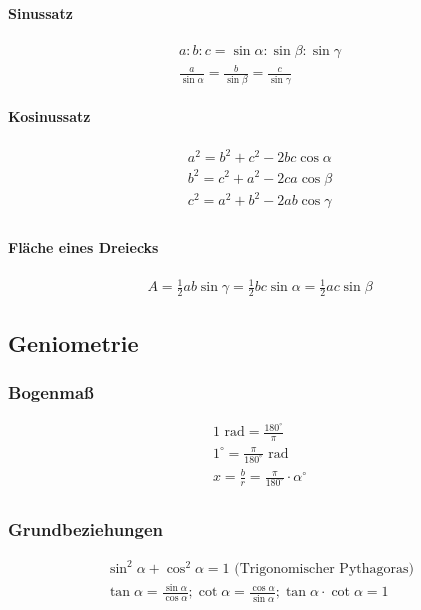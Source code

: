 \paragraph{Sinussatz}
\begin{align*}
    a : b : c = \sin \alpha : \sin \beta :\sin \gamma \\
    \frac{a}{\sin \alpha} = \frac{b}{\sin \beta} = \frac{c}{\sin \gamma}
\end{align*}

\paragraph{Kosinussatz}
\begin{align*}
    a^2 = b^2 + c^2 -2bc \cos \alpha \\
    b^2 = c^2 + a^2 -2ca \cos \beta \\
    c^2 = a^2 + b^2 -2ab \cos \gamma \\
\end{align*}

\paragraph{Fläche eines Dreiecks}
\begin{align*}
    A = \frac{1}{2} ab \sin \gamma = \frac{1}{2} bc \sin \alpha = \frac{1}{2} ac \sin \beta
\end{align*}


\subsection{Geniometrie}
\subsubsection{Bogenmaß}
\begin{align*}
    1  \textrm{ rad} = \frac{180^\circ}{\pi}        \\
    1 ^\circ = \frac{\pi}{180^\circ} \textrm{ rad}  \\
    x = \frac{b}{r} = \frac{\pi}{180^\circ} \cdot \alpha^\circ \\
\end{align*}

\subsubsection{Grundbeziehungen}
\begin{align*}
    \sin^2 \alpha + \cos^2 \alpha = 1 \textrm{ (Trigonomischer Pythagoras)} \\
    \tan \alpha = \frac{\sin \alpha}{\cos \alpha};
    \cot \alpha = \frac{\cos \alpha}{\sin \alpha};
    \tan \alpha \cdot \cot \alpha = 1
\end{align*}

